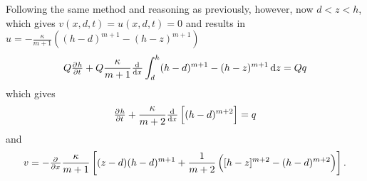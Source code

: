  Following the same method and reasoning as previously, however, now $d < z <h$, which gives $v(x, d, t)= u(x,d,t)= 0$ and results in $u = -\frac{\kappa}{m+1}\left( (h-d)^{m+1} - (h-z)^{m+1} \right)$
%
\begin{equation}
    Q \pd{{h}}{{t}} + Q\frac{\kappa}{m+1}\od{}{{x}}\int_d^h (h-d)^{m+1} - (h - z)^{m+1} \dif{z} = Qq
\end{equation}
which gives
\begin{equation}
    \pd{{h}}{{t}} + \frac{\kappa}{m+2}\od{}{{x}}\left[(h-d)^{m+2}\right] = q
\end{equation}
and
\begin{equation}
    v = - \pd{}{x} \frac{\kappa}{m+1} \left[ (z-d)(h-d)^{m+1} + \frac{1}{m+2} \left( [h-z]^{m+2} - (h-d)^{m+2} \right) \right].
\end{equation}